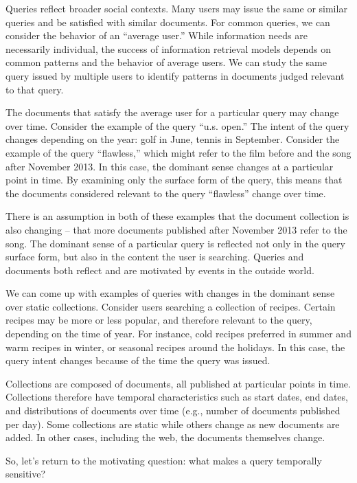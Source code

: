 \documentclass{sig-alternate}
\begin{document}
Queries reflect broader social contexts. Many users may issue the same or similar queries and be satisfied with similar documents.  For common queries, we can consider the behavior of an ``average user.'' While information needs are necessarily individual, the success of information retrieval models depends on common patterns and the behavior of average users. We can study the same query issued by multiple users to identify patterns in documents judged relevant to that query. 

The documents that satisfy the average user for a particular query may change over time.  Consider the example of the query ``u.s. open.'' The intent of the query changes depending on the year: golf in June, tennis in September.  Consider the example of the query ``flawless,'' which might refer to the film before and the song after November 2013. In this case, the dominant sense changes at a particular point in time. By examining only the surface form of the query, this means that the documents considered relevant to the query ``flawless'' change over time.  

There is an assumption in both of these examples that the document collection is also changing -- that more documents published after November 2013 refer to the song. The dominant sense of a particular query is reflected not only in the query surface form, but also in the content the user is searching.  Queries and documents both reflect and are motivated by events in the outside world.

We can come up with examples of queries with changes in the dominant sense over static collections.  Consider users searching a collection of recipes.  Certain recipes may be more or less popular, and therefore relevant to the query, depending on the time of year. For instance, cold recipes preferred in summer and warm recipes in winter, or seasonal recipes around the holidays. In this case, the query intent changes because of the time the query was issued. 

Collections are composed of documents, all published at particular points in time. Collections therefore have temporal characteristics such as start dates, end dates, and distributions of documents over time (e.g., number of documents published per day). Some collections are static while others change as new documents are added. In other cases, including the web, the documents themselves change.  

So, let's return to the motivating question: what makes a query temporally sensitive?
\end{document}
